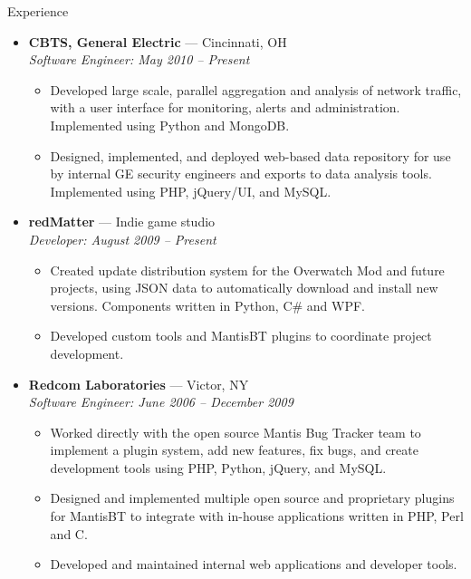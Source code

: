 \documentclass[11pt,oneside]{article}
\newenvironment{ressection}[1]{
	\vspace{8pt}
	{\fontfamily{phv}\selectfont\Large#1}
	\begin{itemize}
	\vspace{3pt}
}{
	\end{itemize}
}
\newcommand{\ressubitem}[1]{
	\vspace{-1pt}
	\item \begin{flushleft} #1 \end{flushleft}
}
\newcommand{\resbigitem}[3]{
	\vspace{-5pt}
	\item
	\textbf{#1} --- #2 \\
	\textit{#3}
}
\newenvironment{ressubsec}[3]{
	\resbigitem{#1}{#2}{#3}
	\vspace{-2pt}
	\begin{itemize}
}{
	\end{itemize}
}
\begin{document}
\begin{ressection}{Experience}

	\begin{ressubsec}{CBTS, General Electric}{Cincinnati, OH}
	{Software Engineer: May 2010 -- Present}
		\ressubitem{Developed large scale, parallel aggregation and analysis of network
		traffic, with a user interface for monitoring, alerts and administration.
		Implemented using Python and MongoDB.}
		\ressubitem{Designed, implemented, and deployed web-based data repository
		for use by internal GE security engineers and exports to data analysis tools.
		Implemented using PHP, jQuery/UI, and MySQL.}
	\end{ressubsec}

	\begin{ressubsec}{redMatter}{Indie game studio}
	{Developer: August 2009 -- Present}
		\ressubitem{Created update distribution system for the Overwatch Mod and future projects, using
		JSON data to automatically download and install new versions.  Components written in Python, C\# and WPF.}
		\ressubitem{Developed custom tools and MantisBT plugins to coordinate project development.}
	\end{ressubsec}

	\begin{ressubsec}{Redcom Laboratories}{Victor, NY}
	{Software Engineer: June 2006 -- December 2009}
		\ressubitem{Worked directly with the open source Mantis Bug Tracker team to implement
		a plugin system, add new features, fix bugs, and create development tools using PHP, Python,
		jQuery, and MySQL.}
		\ressubitem{Designed and implemented multiple open source and proprietary plugins for MantisBT
		to integrate with in-house applications written in PHP, Perl and C.}
		\ressubitem{Developed and maintained internal web applications and developer tools.}
	\end{ressubsec}


\end{ressection}
\end{document}
